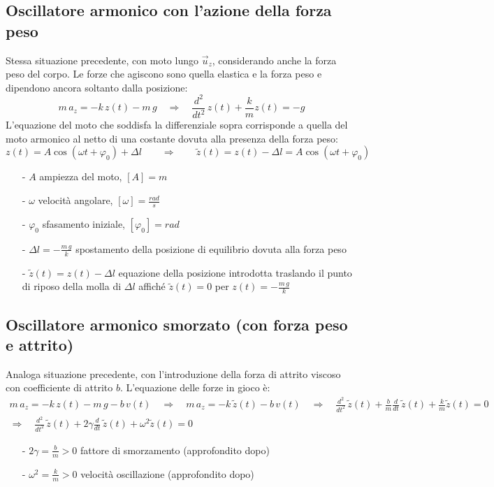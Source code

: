 \documentclass[a4paper]{article}
\newcommand\uz{\vec{u}_z}
\newcommand\dt{\frac{d}{dt}\,}
\newcommand\dts{\frac{d^2}{dt^2}\,}
\begin{document}
\subsection{Oscillatore armonico con l'azione della forza peso}
Stessa situazione precedente, con moto lungo \(\uz\), considerando anche la forza peso del corpo. Le forze che agiscono sono
quella elastica e la forza peso e dipendono ancora soltanto dalla posizione:
\[m \, a_z = -k \, z(t) - m \, g \quad \Rightarrow \quad \dts z(t) + \frac{k}{m} z(t) = -g\]
L'equazione del moto che soddisfa la differenziale sopra corrisponde a quella del moto armonico al netto di una costante
dovuta alla presenza della forza peso:
\[z(t) = A \cos (\omega t + \varphi_0) + \Delta l \qquad \Rightarrow \qquad \tilde{z}(t) = z(t) - \Delta l = A \cos (\omega t + \varphi_0)\]
\begin{itemize}[topsep=3pt, itemsep=0pt]
	\item[-] \(A\) ampiezza del moto, \(\left[A\right] = m\)
	\item[-] \(\omega\) velocità angolare, \(\left[\omega\right] = \frac{rad}{s}\)
	\item[-] \(\varphi_0\) sfasamento iniziale, \(\left[\varphi_0\right] = rad\)
	\item[-] \(\displaystyle \Delta l = - \frac{m \, g}{k}\) spostamento della posizione di equilibrio dovuta alla forza peso
	\item[-] \(\tilde{z}(t) = z(t) - \Delta l\) equazione della posizione introdotta traslando il punto di riposo della molla di \(\Delta l\) affiché \(\tilde{z}(t) = 0\) per \(\displaystyle z(t) = -\frac{m \, g}{k}\)
\end{itemize}

\newpage

\subsection{Oscillatore armonico smorzato (con forza peso e attrito)}
Analoga situazione precedente, con l'introduzione della forza di attrito viscoso con coefficiente di attrito \(b\). L'equazione
delle forze in gioco è:
\begin{multline*}
	m \, a_z = -k \, z(t) - m \, g - b \, v(t) \quad \Rightarrow \quad m \, a_z = -k \, \tilde{z}(t) - b \, v(t) \quad \Rightarrow \quad \dts \tilde{z}(t) + \frac{b}{m} \dt \tilde{z}(t) + \frac{k}{m} \tilde{z}(t) = 0 \\
	\Rightarrow \quad \dts \tilde{z}(t) + 2 \gamma \dt \tilde{z}(t) + \omega^2 \tilde{z}(t) = 0
\end{multline*}
\begin{itemize}[topsep=3pt, itemsep=0pt]
	\item[-] \(\displaystyle 2 \gamma = \frac{b}{m} > 0\) fattore di smorzamento (approfondito dopo)
	\item[-] \(\displaystyle \omega^2 = \frac{k}{m} > 0\) velocità oscillazione (approfondito dopo)
\end{itemize}
\end{document}
